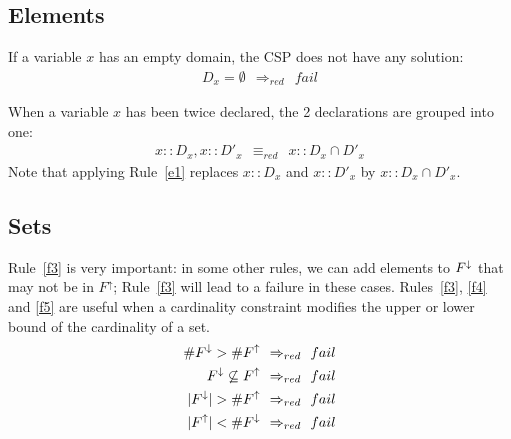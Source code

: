 \documentclass[3p,authoryear,times]{elsarticle}
\newcommand{\card}[1]{|#1|}
\newcommand{\MS}[1]{{{#1}^{\uparrow}}}
\newcommand{\ms}[1]{{\MakeUppercase{#1}^\downarrow}}
\newcommand{\MSF}[0]{\MS{F}}
\newcommand{\msF}[0]{\ms{f}}
\newcommand{\MC}[1]{{\#{#1}^\uparrow{}}}
\newcommand{\mc}[1]{{\#{#1}^\downarrow}}
\newcommand{\MCF}[0]{\MC{F}{}}
\newcommand{\mcF}[0]{\mc{F}{}}
\newcommand{\rmin}[0]{{\Rightarrow_{red}}}
\begin{document}
\subsection{Elements}

If a variable $x$ has an empty domain, the CSP does not have any solution:
\begin{eqnarray}		
D_x=\emptyset ~~\rmin ~~ fail \label{f1}
\end{eqnarray}

When a variable $x$ has been twice declared, the 2 declarations are grouped into one:
\begin{eqnarray}		
x::D_x,x::D'_x~~\equiv_{red} ~~  x::D_x \cap D'_x \label{e1}
\end{eqnarray}
Note that  applying Rule~\ref{e1} replaces $x::D_x$ and $x::D'_x$ by $x::D_x \cap D'_x$.






\subsection{Sets}
%
Rule~\ref{f3} is very important: in some other rules, we can add elements to $\msF$ that may not be in $\MSF$; Rule~\ref{f3} will lead to a failure in these cases.
Rules~\ref{f3}, \ref{f4} and \ref{f5} are useful when a cardinality constraint modifies the upper or lower bound of the cardinality of a set.
\begin{eqnarray}		
\mcF > \MCF  ~~\rmin ~~ fail \label{f2}\\
\msF \not \subseteq \MSF ~~\rmin ~~ fail \label{f3}\\
\card{\msF} > \MCF ~~\rmin ~~ fail \label{f4}\\
\card{\MSF} < \mcF ~~\rmin ~~ fail \label{f5}
\end{eqnarray}
\end{document}
